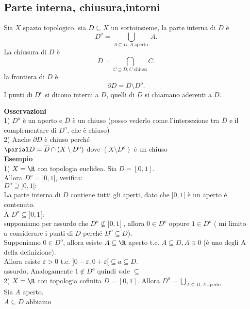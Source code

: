 \documentclass{article}
\begin{document}
	\subsection{Parte interna, chiusura,intorni}
	\begin{defi}
		Sia $X$ spazio topologico, sia $D\subseteq X$ un sottoinsieme, la parte interna di  $D$ è 
		\[
		 D^o = \bigcup_{A\subseteq D, A\text{ aperto } } A
		.\] 
		La chiusura di $D$ è 
		\[
			\overline D = \bigcap_{C\supseteq D, C \text{ chiuso}} C
		.\] 
		la frontiera di $D$ è
		\[
		 \partial D = \overline D \setminus D^o
		.\] 
		I punti di $D^o$ si dicono interni a $D$, quelli di $\overline D$ si chiamano aderenti a $D$.
	\end{defi}
	\textbf{Osservazioni}\\
	1) $D^o$ è un aperto e  $\overline D$ è un chiuso (posso vederlo come l'intersezione tra  $\overline D$ e il complementare di $D^o$, che è chiuso)\\
	 2) Anche $\partial D$ è chiuso perché\\
	 $\parial D = \overline D\cap (X\setminus D^o)$ dove  $(X\setminus D^o)$ è un chiuso\\
	  \textbf{Esempio}\\
	  1) $X = \R$ con topologia euclidea. Sia $D = [0,1]$.\\
	  Allora  $D^o = ]0,1[$, verifica:\\
	  $D^o \supseteq ]0,1[: $\\
	  La parte interna di  $D$ contiene tutti gli aperti, dato che  $]0,1[$ è un aperto è contenuto.\\A
	  $D^o\subseteq ]0,1[$:\\
	  supponiamo per assurdo che  $D^o\not \subseteq ]0,1[$ , allora $0\in D^o$ oppure  $1\in D^o$ ( mi limito a considerare i punti di  $D$ perché $D^o\subseteq D$).\\
	  Supponiamo  $0\in D^o$, allora esiste  $A\subseteq \R$ aperto t.c.  $A\subseteq D, A\ni 0$ (è uno degli A della definizione).\\
	  Allora  esiste $\varepsilon > 0$ t.c.  $]0 - \varepsilon , 0 + \varepsilon[\subseteq a \subseteq D$.\\
	  assurdo, Analogamente  $1\not\in D^o$ quindi vale  $\subseteq$\\
	  2)  $X = \R$ con topologia cofinita $D = [0,1]$. Allora  $D^o = \bigcup_{A\subseteq D, A \text{ aperto}}$ \\
	  Sia  $A$ aperto.\\
	  $A\subseteq D$ abbiamo\\
\end{document}
